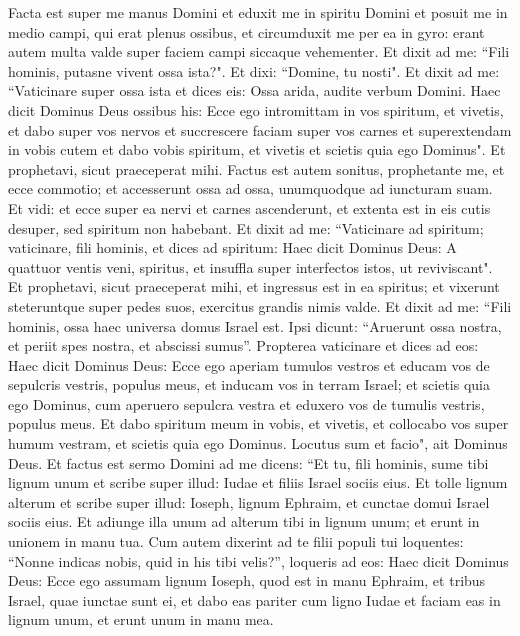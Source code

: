 \begin{biblechapter}  
\verse Facta est super me manus Domini et eduxit me in spiritu Domini et posuit me in medio campi, qui erat plenus ossibus, 
\verse et circumduxit me per ea in gyro: erant autem multa valde super faciem campi siccaque vehementer. 
\verse Et dixit ad me: “Fili hominis, putasne vivent ossa ista?". Et dixi: “Domine, tu nosti". 
\verse Et dixit ad me: “Vaticinare super ossa ista et dices eis: Ossa arida, audite verbum Domini. 
\verse Haec dicit Dominus Deus ossibus his: Ecce ego intromittam in vos spiritum, et vivetis, 
\verse et dabo super vos nervos et succrescere faciam super vos carnes et superextendam in vobis cutem et dabo vobis spiritum, et vivetis et scietis quia ego Dominus". 
\verse Et prophetavi, sicut praeceperat mihi. Factus est autem sonitus, prophetante me, et ecce commotio; et accesserunt ossa ad ossa, unumquodque ad iuncturam suam. 
\verse Et vidi: et ecce super ea nervi et carnes ascenderunt, et extenta est in eis cutis desuper, sed spiritum non habebant. 
\verse Et dixit ad me: “Vaticinare ad spiritum; vaticinare, fili hominis, et dices ad spiritum: Haec dicit Dominus Deus: A quattuor ventis veni, spiritus, et insuffla super interfectos istos, ut reviviscant". 
\verse Et prophetavi, sicut praeceperat mihi, et ingressus est in ea spiritus; et vixerunt steteruntque super pedes suos, exercitus grandis nimis valde. 
\verse Et dixit ad me: “Fili hominis, ossa haec universa domus Israel est. Ipsi dicunt: “Aruerunt ossa nostra, et periit spes nostra, et abscissi sumus”. 
\verse Propterea vaticinare et dices ad eos: Haec dicit Dominus Deus: Ecce ego aperiam tumulos vestros et educam vos de sepulcris vestris, populus meus, et inducam vos in terram Israel; 
\verse et scietis quia ego Dominus, cum aperuero sepulcra vestra et eduxero vos de tumulis vestris, populus meus. 
\verse Et dabo spiritum meum in vobis, et vivetis, et collocabo vos super humum vestram, et scietis quia ego Dominus. Locutus sum et facio", ait Dominus Deus. 
\verse Et factus est sermo Domini ad me dicens: 
\verse “Et tu, fili hominis, sume tibi lignum unum et scribe super illud: Iudae et filiis Israel sociis eius. Et tolle lignum alterum et scribe super illud: Ioseph, lignum Ephraim, et cunctae domui Israel sociis eius. 
\verse Et adiunge illa unum ad alterum tibi in lignum unum; et erunt in unionem in manu tua. 
\verse Cum autem dixerint ad te filii populi tui loquentes: “Nonne indicas nobis, quid in his tibi velis?”, 
\verse loqueris ad eos: Haec dicit Dominus Deus: Ecce ego assumam lignum Ioseph, quod est in manu Ephraim, et tribus Israel, quae iunctae sunt ei, et dabo eas pariter cum ligno Iudae et faciam eas in lignum unum, et erunt unum in manu mea. 

\end{biblechapter}
